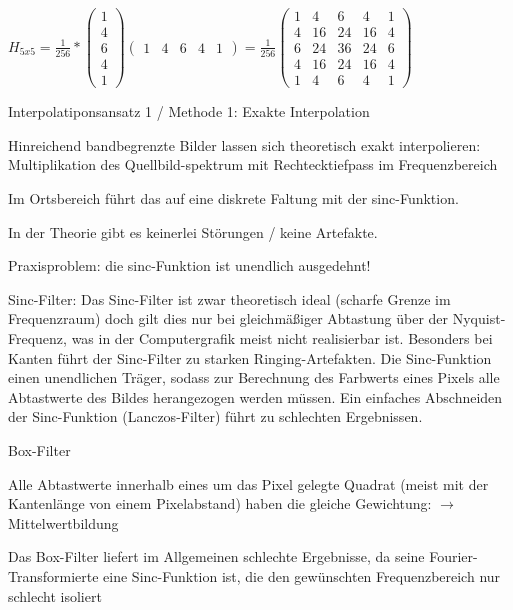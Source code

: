 \documentclass[landscape]{article}
\begin{document}
\begin{multicols}{3}
  $H_{5x5} =\frac{1}{256} * \begin{pmatrix} 1\\4\\6\\4\\1 \end{pmatrix} \begin{pmatrix} 1&4&6&4&1 \end{pmatrix}=\frac{1}{256} \begin{pmatrix} 1&4&6&4&1\\ 4&16&24&16&4\\ 6&24&36&24&6\\ 4&16&24&16&4\\ 1&4&6&4&1 \end{pmatrix}$
  
  Interpolatiponsansatz 1 / Methode 1: Exakte Interpolation
  \begin{itemize*}
    \item Hinreichend bandbegrenzte Bilder lassen sich theoretisch exakt interpolieren: Multiplikation des Quellbild-spektrum mit Rechtecktiefpass im Frequenzbereich
    \item Im Ortsbereich führt das auf eine diskrete Faltung mit der sinc-Funktion.
    \item In der Theorie gibt es keinerlei Störungen / keine Artefakte.
    \item Praxisproblem: die sinc-Funktion ist unendlich ausgedehnt!
  \end{itemize*}
  
  Sinc-Filter: Das Sinc-Filter ist zwar theoretisch ideal (scharfe Grenze im Frequenzraum) doch gilt dies nur bei gleichmäßiger Abtastung über der Nyquist-Frequenz, was in der Computergrafik meist nicht realisierbar ist. Besonders bei Kanten führt der Sinc-Filter zu starken Ringing-Artefakten. 
  Die Sinc-Funktion einen unendlichen Träger, sodass zur Berechnung des Farbwerts eines Pixels alle Abtastwerte des Bildes herangezogen werden müssen. Ein einfaches Abschneiden der Sinc-Funktion (Lanczos-Filter) führt zu schlechten Ergebnissen.
  
  \begin{itemize*}
    \item Box-Filter
    \begin{itemize*}
      \item Alle Abtastwerte innerhalb eines um das Pixel gelegte Quadrat (meist mit der Kantenlänge von einem Pixelabstand) haben die gleiche Gewichtung: $\rightarrow$ Mittelwertbildung
      \item Das Box-Filter liefert im Allgemeinen schlechte Ergebnisse, da seine Fourier-Transformierte eine Sinc-Funktion ist, die den gewünschten Frequenzbereich nur schlecht isoliert
    \end{itemize*}
    

\end{itemize*}
\end{multicols}
\end{document}
